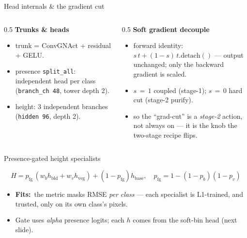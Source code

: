 \documentclass[aspectratio=169,11pt]{beamer}
\newcommand{\fit}{\textcolor{cHead}{\textbf{Fits:}}\ }
\newcommand{\code}[1]{\texttt{\small #1}}
\begin{document}
\begin{frame}{Head internals \& the gradient cut}
  \begin{columns}[T]
    \begin{column}{0.5\textwidth}
      \textbf{Trunks \& heads}
      \begin{itemize}\small
        \item trunk = ConvGNAct + residual + GELU.
        \item presence \code{split\_all}: independent head per class
          (\code{branch\_ch 48}, tower depth 2).
        \item height: 3 independent branches (\code{hidden 96}, depth 2).
      \end{itemize}
    \end{column}
    \begin{column}{0.5\textwidth}
      \textbf{Soft gradient decouple}
      \begin{itemize}\small
        \item forward identity:\\ $s\,t+(1{-}s)\,t.\text{detach}()$ --- output
          unchanged; only the backward gradient is scaled.
        \item $s\,{=}\,1$ coupled (stage-1); $s\,{=}\,0$ hard cut (stage-2 purify).
        \item so the ``grad-cut'' is a \emph{stage-2} action, not always on --- it
          is the knob the two-stage recipe flips.
      \end{itemize}
    \end{column}
  \end{columns}
\end{frame}

\begin{frame}{Presence-gated height specialists}
  \begin{center}
  \end{center}
  \[ H = p_{\text{fg}}\,(w_b h_{\text{bld}}+w_v h_{\text{veg}})+(1-p_{\text{fg}})h_{\text{base}},
     \quad p_{\text{fg}}{=}1{-}(1{-}p_b)(1{-}p_v) \]
  \begin{itemize}
    \item \fit the metric masks RMSE \emph{per class} --- each specialist is
      L1-trained, and trusted, only on its own class's pixels.
    \item Gate uses \emph{alpha} presence logits; each $h$ comes from the
      soft-bin head (next slide).
  \end{itemize}
\end{frame}
\end{document}
